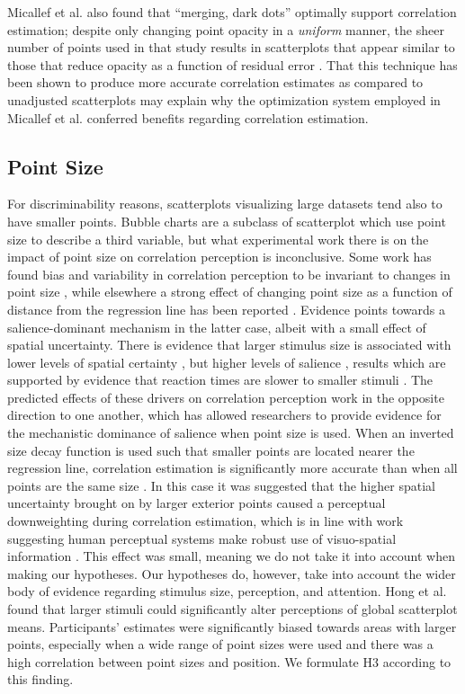 \documentclass[manuscript, review, anonymous, screen]{acmart}
\begin{document}
Micallef et al. \citep{micallef_2017} also found that ``merging, dark
dots'' optimally support correlation estimation; despite only changing
point opacity in a \emph{uniform} manner, the sheer number of points
used in that study results in scatterplots that appear similar to those
that reduce opacity as a function of residual error \citep{strain_2023}.
That this technique has been shown to produce more accurate correlation
estimates as compared to unadjusted scatterplots may explain why the
optimization system employed in Micallef et al. \citep{micallef_2017}
conferred benefits regarding correlation estimation.

\hypertarget{sec-point-size}{%
\subsection{Point Size}\label{sec-point-size}}

For discriminability reasons, scatterplots visualizing large datasets
tend also to have smaller points. Bubble charts are a subclass of
scatterplot which use point size to describe a third variable, but what
experimental work there is on the impact of point size on correlation
perception is inconclusive. Some work has found bias and variability in
correlation perception to be invariant to changes in point size
\citep{rensink_2012, rensink_2014}, while elsewhere a strong effect of
changing point size as a function of distance from the regression line
has been reported \citep{strain_2023b}. Evidence points towards a
salience-dominant mechanism in the latter case, albeit with a small
effect of spatial uncertainty. There is evidence that larger stimulus
size is associated with lower levels of spatial certainty
\citep{alais_2004}, but higher levels of salience \citep{healey_2011},
results which are supported by evidence that reaction times are slower
to smaller stimuli \citep{gramazio_2014, osaka_1976}. The predicted
effects of these drivers on correlation perception work in the opposite
direction to one another, which has allowed researchers to provide
evidence for the mechanistic dominance of salience when point size is
used. When an inverted size decay function is used such that smaller
points are located nearer the regression line, correlation estimation is
significantly more accurate than when all points are the same size
\citep{strain_2023b}. In this case it was suggested that the higher
spatial uncertainty brought on by larger exterior points caused a
perceptual downweighting during correlation estimation, which is in line
with work suggesting human perceptual systems make robust use of
visuo-spatial information
\citep{strain_2023b, warren_2002, warren_2004}. This effect was small,
meaning we do not take it into account when making our hypotheses. Our
hypotheses do, however, take into account the wider body of evidence
regarding stimulus size, perception, and attention. Hong et al.
\citep{hong_2021} found that larger stimuli could significantly alter
perceptions of global scatterplot means. Participants' estimates were
significantly biased towards areas with larger points, especially when a
wide range of point sizes were used and there was a high correlation
between point sizes and position. We formulate H3 according to this
finding.
\end{document}
